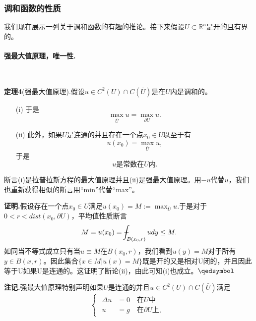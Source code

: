 \documentclass[leqno]{article}
\def\Xint#1{\mathchoice
	{\XXint\displaystyle\textstyle{#1}}%
	{\XXint\textstyle\scriptstyle{#1}}%
	{\XXint\scriptstyle\scriptscriptstyle{#1}}%
	{\XXint\scriptscriptstyle\scriptscriptstyle{#1}}%
	\!\int}
\def\XXint#1#2#3{{\setbox0=\hbox{$#1{#2#3}{\int}$ }
		\vcenter{\hbox{$#2#3$ }}\kern-.6\wd0}}
\def\dashint{\Xint-}
\numberwithin{equation}{subsection}%
\begin{document}
\subsubsection{调和函数的性质}
我们现在展示一列关于调和函数的有趣的推论。接下来假设$U\subset\mathbb{R}^{n}$是开的且有界的。
\paragraph{强最大值原理，唯一性.}~{}
\par
\noindent\textbf{定理4}(强最大值原理).假设$u\in C^{2}(U)\cap C(\bar{U})$是在$U$内是调和的。
\begin{enumerate}[itemindent=2em]
	\item[(i)]于是
	\begin{equation*}
	\max_{\bar{U}}u=\max_{\partial U}u.
	\end{equation*} 
	\item[(ii)]此外，如果$U$是连通的并且存在一个点$x_{0}\in U$以至于有
	\begin{equation*}
	u(x_{0})=\max_{\bar{U}}u,
	\end{equation*}
	于是
	\begin{equation*}
	u\text{是常数在}U\text{内}.
	\end{equation*}
\end{enumerate}
断言(i)是拉普拉斯方程的最大值原理并且(ii)是强最大值原理。用$-u$代替$u$，我们也重新获得相似的断言用“min”代替“max”。
\par
\noindent\textbf{证明.}假设存在一个点$x_{0}\in U$满足$u(x_{0})=M:=\max_{\bar{U}}u.$于是对于$0<r<dist(x_{0},\partial U)$，平均值性质断言
\begin{equation*}
M=u(x_{0})=\dashint_{B(x_{0},r)}udy\leq M.
\end{equation*}
如同当不等式成立只有当$u\equiv M$在$B(x_{0},r)$，我们看到$u(y)=M$对于所有$y\in B(x,r)$。因此集合$\{x\in M|u(x)=M\}$既是开的又是相对U闭的，并且因此等于U如果U是连通的。这证明了断论(ii)，由此可知(i)也成立。$\hfill\qedsymbol$
\par
\noindent\textbf{注记.}强最大值原理特别声明如果$U$是连通的并且$u\in C^{2}(U)\cap C(\bar{U})$满足
\begin{equation*}
\begin{cases}
\begin{aligned}
\Delta u&=0 \quad \text{在}U\text{中}\\
u&=g \quad \text{在} \partial U\text{上},
\end{aligned}
\end{cases}
\end{equation*}
\end{document}
